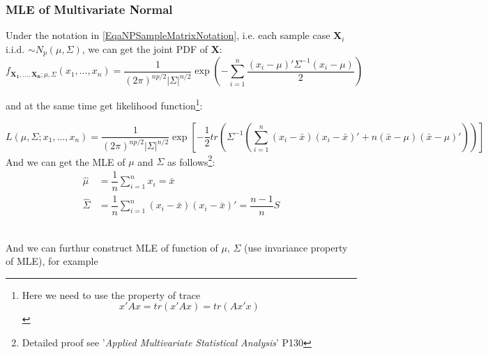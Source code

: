     
    
\subsubsection{MLE of Multivariate Normal}
    Under the notation in \autoref{EqaNPSampleMatrixNotation}, i.e. each sample case $ \mathbf{X}_i$ i.i.d. $\sim N_p(\mu,\Sigma ) $, we can get the joint PDF of $ \mathbf{X} $:
    \begin{equation}
        f_{\mathbf{X_1},\ldots,\mathbf{X_n};\mu,\Sigma }(x_1,\ldots,x_n)=\dfrac{1}{(2\pi)^{np/2}|\Sigma |^{n/2}}\exp\left( -\sum_{i=1}^n\dfrac{(x_i-\mu)'\Sigma ^{-1}(x_i-\mu)}{2} \right) 
    \end{equation}
  
    and at the same time get likelihood function\footnote{Here we need to use the property of trace
    \begin{equation}
        x'Ax=tr(x'Ax)=tr(Ax'x)
    \end{equation}    }:
    
    \begin{equation}
        L(\mu ,\Sigma;x_1,\ldots,x_n)=\dfrac{1}{(2\pi)^{np/2}|\Sigma |^{n/2}}\exp\left[ -\dfrac{1}{2}tr\left( \Sigma ^{-1} \left(\sum_{i=1}^n(x_i-\bar{x})(x_i-\bar{x})'+n(\bar{x}-\mu)(\bar{x}-\mu)' \right) \right) \right]
    \end{equation}
        And we can get the MLE of $ \mu $ and $ \Sigma  $ as follows\footnote{Detailed proof see '\textit{Applied Multivariate Statistical Analysis}' P130}:
        \begin{align*}
            \hat{\mu}&= \dfrac{1}{n}\sum_{i=1}^n x_i=\bar{x} \\
            \hat{\Sigma  }&= \dfrac{1}{n}\sum_{i=1}^n(x_i-\bar{x})(x_i-\bar{x})'=\dfrac{n-1}{n}S
        \end{align*}

        \\
    
    And we can furthur construct MLE of function of $ \mu,\,\Sigma  $ (use invariance property of MLE), for example 
    

